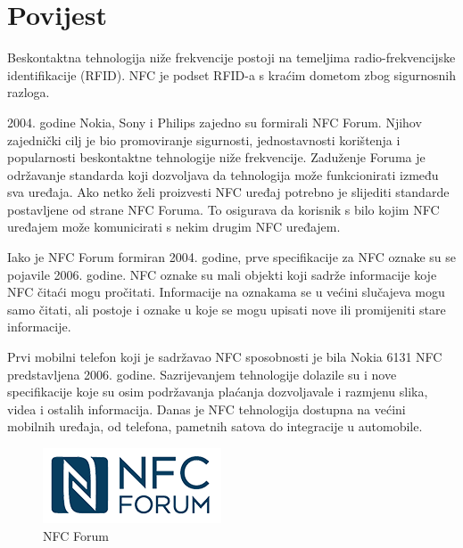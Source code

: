 \documentclass[times, utf8, zavrsni]{fer}
\begin{document}
\section{Povijest}
Beskontaktna tehnologija niže frekvencije postoji na temeljima radio-frekvencijske identifikacije (RFID). NFC je podset RFID-a s kraćim dometom zbog sigurnosnih razloga.\par 
2004. godine Nokia, Sony i Philips zajedno su formirali NFC Forum. Njihov zajednički cilj je bio promoviranje sigurnosti, jednostavnosti korištenja i popularnosti beskontaktne tehnologije niže frekvencije. Zaduženje Foruma je održavanje standarda koji dozvoljava da tehnologija može funkcionirati između sva uređaja. Ako netko želi proizvesti NFC uređaj potrebno je slijediti standarde postavljene od strane NFC Foruma. To osigurava da korisnik s bilo kojim NFC uređajem može komunicirati s nekim drugim NFC uređajem.\par
Iako je NFC Forum formiran 2004. godine, prve specifikacije za NFC oznake su se pojavile 2006. godine. NFC oznake su mali objekti koji sadrže informacije koje NFC čitaći mogu pročitati. Informacije na oznakama se u većini slučajeva mogu samo čitati, ali postoje i oznake u koje se mogu upisati nove ili promijeniti stare informacije.\par 
Prvi mobilni telefon koji je sadržavao NFC sposobnosti je bila Nokia 6131 NFC predstavljena 2006. godine. Sazrijevanjem tehnologije dolazile su i nove specifikacije koje su osim podržavanja plaćanja dozvoljavale i razmjenu slika, videa i ostalih informacija. Danas je NFC tehnologija dostupna na većini mobilnih uređaja, od telefona, pametnih satova do integracije u automobile.

\begin{figure}[h]
\includegraphics[scale=1.0]{nfc.png}
\centering
\caption{NFC Forum}
\centering
\end{figure}
\end{document}
